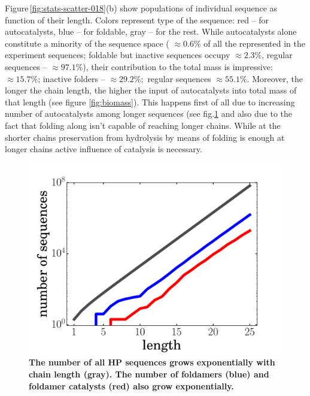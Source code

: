 \documentclass[journal=jacsat,manuscript=article,layout=twocolumn]{achemso}
\begin{document}
Figure\,\ref{fig:stats-scatter-018}(b) show populations of individual sequence as function of 
their 
length. Colors represent type of the sequence: red -- for autocatalysts, blue -- for foldable, 
gray 
-- for the rest. While autocatalysts alone constitute a minority of the sequence space ( $\approx 
0.6\%$ 
of all the represented in the experiment sequences; foldable but inactive sequences occupy 
$\approx 
2.3\%$, regular sequences -- $\approx97.1\%$), their contribution to the total mass is impressive: 
$\approx 15.7\%$; inactive folders -- $\approx 29.2\%;$ regular sequences $\approx 55.1\%$. 
Moreover, the longer the chain length, the higher the input of autocatalysts into total mass of 
that length (see figure \ref{fig:biomass}). This happens first of all due to increasing number of 
autocatalysts among longer sequences (see fig.\ref{fig:hp-statistics} and also due to the fact 
that 
folding along isn't capable of reaching longer chains. While at the shorter chains preservation 
from hydrolysis by means of folding is enough at longer chains active influence of catalysis is 
necessary.
\begin{figure}[hbt!]
  \centering
  \includegraphics[width=\columnwidth]{pictures/hp-statistics.pdf} 
  \caption{\footnotesize{\textbf{The number of all HP sequences grows exponentially with chain 
length (gray).  The number of foldamers (blue) and foldamer catalysts (red) also grow 
exponentially.}}}
  \label{fig:hp-statistics}
\end{figure}
\end{document}

